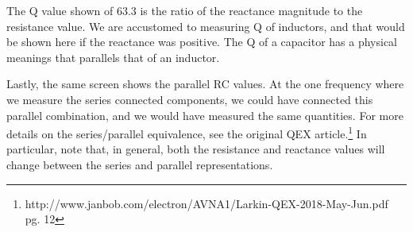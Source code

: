 The Q value shown of 63.3 is the ratio of the reactance magnitude to the resistance value.  We are accustomed to measuring Q of inductors, and that would be shown here if the reactance was positive.  The Q of a capacitor has a physical meanings that parallels that of an inductor.

Lastly, the same screen shows the parallel RC values. At the one frequency where we measure the series connected components, we could have connected this parallel combination, and we would have measured the same quantities.
For more details on the series/parallel equivalence, see the original QEX article.\footnote{http://www.janbob.com/electron/AVNA1/Larkin-QEX-2018-May-Jun.pdf pg. 12}
%
In particular, note that, in general, both the resistance and reactance values will change between the series and parallel representations.

